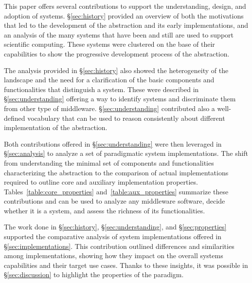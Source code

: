 \documentclass{sig-alternate}
\begin{document}

This paper offers several contributions to support the understanding, design,
and adoption of \pilot systems. \S\ref{sec:history} provided an overview of both
the motivations that led to the development of the \pilot abstraction and its
early implementations, and an analysis of the many \pilot systems that have been
and still are used to support scientific computing. These systems were clustered
on the base of their capabilities to show the progressive development process of
the \pilot abstraction.

The analysis provided in \S\ref{sec:history} also showed the heterogeneity of
the \pilot landscape and the need for a clarification of the basic components
and functionalities that distinguish a \pilot system. These were described in
\S\ref{sec:understanding} offering a way to identify \pilot systems and
discriminate them from other type of middleware. \S\ref{sec:understanding}
contributed also a well-defined vocabulary that can be used to reason
consistently about different implementation of the \pilot abstraction.

Both contributions offered in \S\ref{sec:understanding} were then leveraged in
\S\ref{sec:analysis} to analyze a set of paradigmatic \pilot system
implementations. The shift from understanding the minimal set of components and
functionalities characterizing the \pilot abstraction to the comparison of
actual \pilot implementations required to outline core and auxiliary
implementation properties. Tables~\ref{table:core_properties}
and~\ref{table:aux_properties} summarize these contributions and can be used to
analyze any middleware software, decide whether it is a \pilot system, and
assess the richness of its functionalities.

The work done in \S\ref{sec:history}, \S\ref{sec:understanding}, and
\S\ref{sec:properties} supported the comparative analysis of \pilot system
implementations offered in \S\ref{sec:implementations}. This contribution
outlined differences and similarities among implementations, showing how they
impact on the overall \pilot systems capabilities and their target use cases.
Thanks to these insights, it was possible in \S\ref{sec:discussion} to highlight
the properties of the \pilot paradigm.
\end{document}
